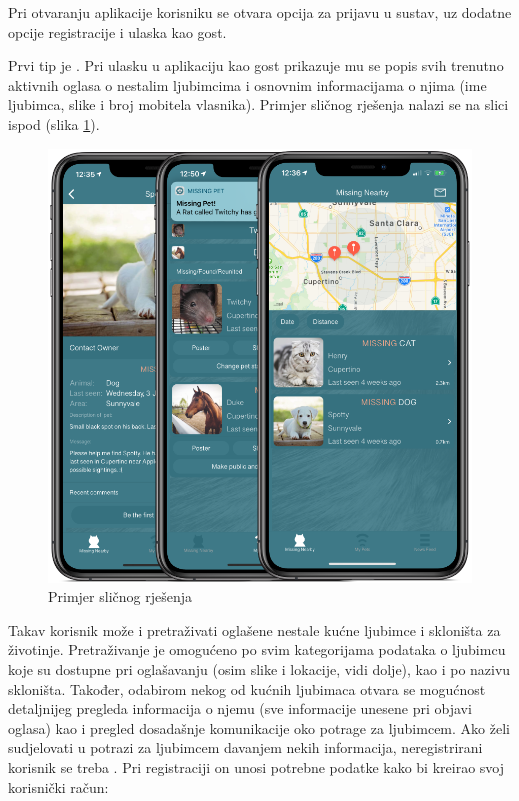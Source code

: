 Pri otvaranju aplikacije korisniku se otvara opcija za prijavu u sustav, uz dodatne opcije registracije i ulaska kao gost.

		Prvi tip je . Pri ulasku u aplikaciju kao gost prikazuje mu se popis svih trenutno aktivnih oglasa o nestalim ljubimcima i osnovnim informacijama o njima (ime ljubimca, slike i broj mobitela vlasnika). Primjer sličnog rješenja nalazi se na slici ispod (slika \ref{fig:slika1}).

		\begin{figure}[H]
			\includegraphics[scale=0.4]{slike/ljubimci.PNG} %
			\centering
			\caption{Primjer sličnog rješenja}
			\label{fig:slika1}
		\end{figure}

		Takav korisnik može i pretraživati oglašene nestale kućne ljubimce i skloništa za životinje. Pretraživanje je omogućeno po svim kategorijama podataka o ljubimcu koje su dostupne pri oglašavanju (osim slike i lokacije, vidi dolje), kao i po nazivu skloništa. Također, odabirom nekog od kućnih ljubimaca otvara se mogućnost detaljnijeg pregleda informacija o njemu (sve informacije unesene pri objavi oglasa) kao i pregled dosadašnje komunikacije oko potrage za ljubimcem.
Ako želi sudjelovati u potrazi za ljubimcem davanjem nekih informacija, neregistrirani korisnik se treba . Pri registraciji on unosi potrebne podatke kako bi kreirao svoj korisnički račun:

